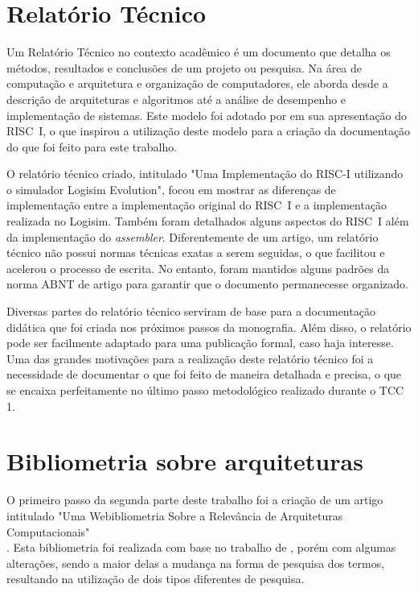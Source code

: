 \documentclass[
	12pt,				%
	openright,			%
	oneside,			%
	a4paper,			%
	english,			%
	french,				%
	spanish,			%
	brazil,				%
	]{abntex2}
\begin{document}
\section{Relatório Técnico}

Um Relatório Técnico no contexto acadêmico é um documento que detalha os métodos, resultados e conclusões de um projeto ou pesquisa. Na área de computação e arquitetura e organização de computadores, ele aborda desde a descrição de arquiteturas e algoritmos até a análise de desempenho e implementação de sistemas. Este modelo foi adotado por \cite{peek_vlsi_1983} em sua apresentação do RISC~I, o que inspirou a utilização deste modelo para a criação da documentação do que foi feito para este trabalho.

O relatório técnico criado, intitulado "Uma Implementação do RISC-I utilizando o simulador Logisim Evolution", focou em mostrar as diferenças de implementação entre a implementação original do RISC~I e a implementação realizada no Logisim. Também foram detalhados alguns aspectos do RISC~I além da implementação do \textit{assembler}. Diferentemente de um artigo, um relatório técnico não possui normas técnicas exatas a serem seguidas, o que facilitou e acelerou o processo de escrita. No entanto, foram mantidos alguns padrões da norma ABNT de artigo para garantir que o documento permanecesse organizado.

Diversas partes do relatório técnico serviram de base para a documentação didática que foi criada nos próximos passos da monografia. Além disso, o relatório pode ser facilmente adaptado para uma publicação formal, caso haja interesse. Uma das grandes motivações para a realização deste relatório técnico foi a necessidade de documentar o que foi feito de maneira detalhada e precisa, o que se encaixa perfeitamente no último passo metodológico realizado durante o TCC 1.

\section{Bibliometria sobre arquiteturas}\label{bibliometry}

O primeiro passo da segunda parte deste trabalho foi a criação de um artigo intitulado "Uma Webibliometria Sobre a Relevância de Arquiteturas Computacionais" \\ \cite{valadares_uma_2025}. Esta bibliometria foi realizada com base no trabalho de , porém com algumas alterações, sendo a maior delas a mudança na forma de pesquisa dos termos, resultando na utilização de dois tipos diferentes de pesquisa.
\end{document}
